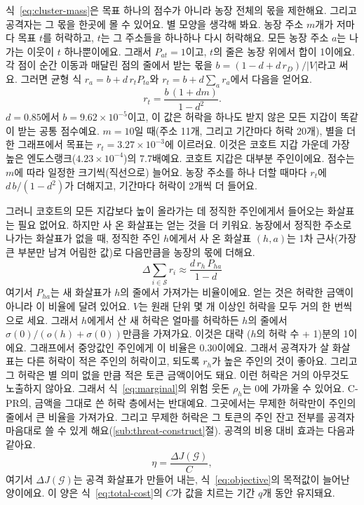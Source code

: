 식~\eqref{eq:cluster-mass}은 목표 하나의 점수가 아니라 농장 전체의 몫을 제한해요. 그리고 공격자는 그 몫을 한곳에 몰 수 있어요. 별 모양을 생각해 봐요. 농장 주소 $m$개가 저마다 목표 $t$를 허락하고, $t$는 그 주소들을 하나하나 다시 허락해요. 모든 농장 주소 $a$는 나가는 이웃이 $t$ 하나뿐이에요. 그래서 $P_{at}=1$이고, $t$의 줄은 농장 위에서 합이 1이에요. 각 점이 순간 이동과 매달린 점의 줄에서 받는 몫을 $b=(1-d+d\,r_D)/|V|$라고 써요. 그러면 균형 식 $r_a=b+d\,r_t P_{ta}$와 $r_t=b+d\sum_a r_a$에서 다음을 얻어요.
\begin{equation*}
r_t = \frac{b\,(1+dm)}{1-d^2}.
\end{equation*}
$d=0.85$에서 $b=9.62\times10^{-5}$이고, 이 값은 허락을 하나도 받지 않은 모든 지갑이 똑같이 받는 공통 점수예요. $m=10$일 때(주소 11개, 그리고 기간마다 허락 20개), 별을 더한 그래프에서 목표는 $r_t=3.27\times10^{-3}$에 이르러요. 이것은 코호트 지갑 가운데 가장 높은 엔도스랭크($4.23\times10^{-4}$)의 7.7배예요. 코호트 지갑은 대부분 주인이에요. 점수는 $m$에 따라 일정한 크기씩(직선으로) 늘어요. 농장 주소를 하나 더할 때마다 $r_t$에 $d\,b/(1-d^2)$가 더해지고, 기간마다 허락이 2개씩 더 들어요.

그러니 코호트의 모든 지갑보다 높이 올라가는 데 정직한 주인에게서 들어오는 화살표는 필요 없어요. 하지만 사 온 화살표는 얻는 것을 더 키워요. 농장에서 정직한 주소로 나가는 화살표가 없을 때, 정직한 주인 $h$에게서 사 온 화살표 $(h,a)$는 1차 근사(가장 큰 부분만 남겨 어림한 값)로 다음만큼을 농장의 몫에 더해요.
\begin{equation*}
\Delta\sum_{i\in\mathcal{S}} r_i \approx \frac{d\,r_h\,P_{ha}}{1-d}
\end{equation*}
여기서 $P_{ha}$는 새 화살표가 $h$의 줄에서 가져가는 비율이에요. 얻는 것은 허락한 금액이 아니라 이 비율에 달려 있어요. $V$는 원래 단위 몇 개 이상인 허락을 모두 거의 한 번씩으로 세요. 그래서 $h$에게서 산 새 허락은 얼마를 허락하든 $h$의 줄에서 $\sigma(0)/(o(h)+\sigma(0))$만큼을 가져가요. 이것은 대략 ($h$의 허락 수 + 1)분의 1이에요. 그래프에서 중앙값인 주인에게 이 비율은 $0.30$이에요. 그래서 공격자가 살 화살표는 다른 허락이 적은 주인의 허락이고, 되도록 $r_h$가 높은 주인의 것이 좋아요. 그리고 그 허락은 별 의미 없을 만큼 적은 토큰 금액이어도 돼요. 이런 허락은 거의 아무것도 노출하지 않아요. 그래서 식~\eqref{eq:marginal}의 위험 웃돈 $\rho_h$는 0에 가까울 수 있어요. C-PR의, 금액을 그대로 쓴 허락 층에서는 반대예요. 그곳에서는 무제한 허락만이 주인의 줄에서 큰 비율을 가져가요. 그리고 무제한 허락은 그 토큰의 주인 잔고 전부를 공격자 마음대로 쓸 수 있게 해요(\ref{sub:threat-construct}절). 공격의 비용 대비 효과는 다음과 같아요.
\begin{equation}
\label{eq:efficiency}
\eta = \frac{\Delta J(\mathcal{G})}{C},
\end{equation}
여기서 $\Delta J(\mathcal{G})$는 공격 화살표가 만들어 내는, 식~\eqref{eq:objective}의 목적값이 늘어난 양이에요. 이 양은 식~\eqref{eq:total-cost}의 $C$가 값을 치르는 기간 $q$개 동안 유지돼요.

